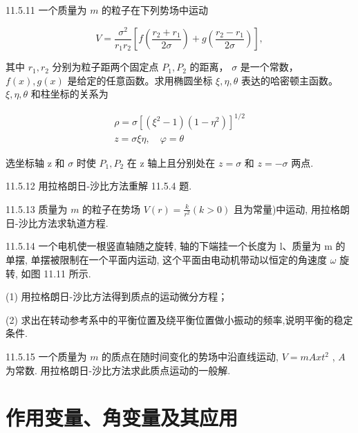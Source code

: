 \begin{problem}{11.5.11}
一个质量为 $m$ 的粒子在下列势场中运动

\[
V = \frac {\sigma^ {2}}{r _ {1} r _ {2}} \left[ f \left(\frac {r _ {2} + r _ {1}}{2 \sigma}\right) + g \left(\frac {r _ {2} - r _ {1}}{2 \sigma}\right) \right],
\]

其中 $r_1, r_2$ 分别为粒子距两个固定点 $P_1, P_2$ 的距离， $\sigma$ 是一个常数， $f(x), g(x)$ 是给定的任意函数。求用椭圆坐标 $\xi, \eta, \theta$ 表达的哈密顿主函数。 $\xi, \eta, \theta$ 和柱坐标的关系为

\[
\begin{array}{l} \rho = \sigma [ (\xi^ {2} - 1) (1 - \eta^ {2}) ] ^ {1 / 2} \\ z = \sigma \xi \eta , \quad \varphi = \theta \end{array}
\]

选坐标轴 z 和 $\sigma$ 时使 $P_{1}, P_{2}$ 在 z 轴上且分别处在 $z = \sigma$ 和 $z = -\sigma$ 两点.
\end{problem}
\clearpage


\begin{problem}{11.5.12}
用拉格朗日-沙比方法重解 11.5.4 题.
\end{problem}
\clearpage


\begin{problem}{11.5.13}
质量为 $m$ 的粒子在势场 $V(r) = \frac{k}{r^2} (k > 0)$ 且为常量)中运动, 用拉格朗日-沙比方法求轨道方程.
\end{problem}
\clearpage


\begin{problem}{11.5.14}
一个电机使一根竖直轴随之旋转, 轴的下端挂一个长度为 l、质量为 m 的单摆, 单摆被限制在一个平面内运动, 这个平面由电动机带动以恒定的角速度 $\omega$ 旋转, 如图 11.11 所示.

(1) 用拉格朗日-沙比方法得到质点的运动微分方程；

(2) 求出在转动参考系中的平衡位置及绕平衡位置做小振动的频率,说明平衡的稳定条件.
\begin{center}

\end{center}
\end{problem}
\clearpage


\begin{problem}{11.5.15}
一个质量为 $m$ 的质点在随时间变化的势场中沿直线运动, $V = mAxt^2$ , $A$ 为常数. 用拉格朗日-沙比方法求此质点运动的一般解.
\end{problem}
\clearpage


\section{作用变量、角变量及其应用}

